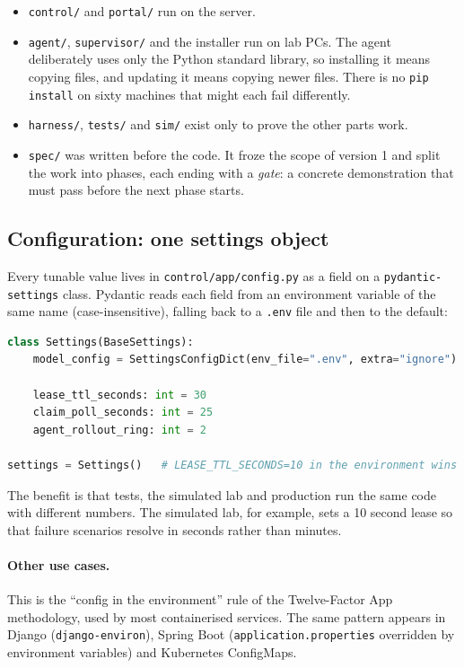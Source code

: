 \begin{itemize}
\item \texttt{control/} and \texttt{portal/} run on the server.
\item \texttt{agent/}, \texttt{supervisor/} and the installer run on lab PCs.
  The agent deliberately uses only the Python standard library, so installing
  it means copying files, and updating it means copying newer files. There is
  no \texttt{pip install} on sixty machines that might each fail differently.
\item \texttt{harness/}, \texttt{tests/} and \texttt{sim/} exist only to
  prove the other parts work.
\item \texttt{spec/} was written before the code. It froze the scope of version
  1 and split the work into phases, each ending with a \emph{gate}: a concrete
  demonstration that must pass before the next phase starts.
\end{itemize}

\subsection{Configuration: one settings object}

Every tunable value lives in \texttt{control/app/config.py} as a field on a
\texttt{pydantic-settings} class. Pydantic reads each field from an environment
variable of the same name (case-insensitive), falling back to a
\texttt{.env} file and then to the default:

\begin{lstlisting}[language=Python]
class Settings(BaseSettings):
    model_config = SettingsConfigDict(env_file=".env", extra="ignore")

    lease_ttl_seconds: int = 30
    claim_poll_seconds: int = 25
    agent_rollout_ring: int = 2

settings = Settings()   # LEASE_TTL_SECONDS=10 in the environment wins
\end{lstlisting}

The benefit is that tests, the simulated lab and production run the same code
with different numbers. The simulated lab, for example, sets a 10 second lease
so that failure scenarios resolve in seconds rather than minutes.

\paragraph{Other use cases.} This is the ``config in the environment'' rule of
the Twelve-Factor App methodology, used by most containerised services. The
same pattern appears in Django (\texttt{django-environ}), Spring Boot
(\texttt{application.properties} overridden by environment variables) and
Kubernetes ConfigMaps.

